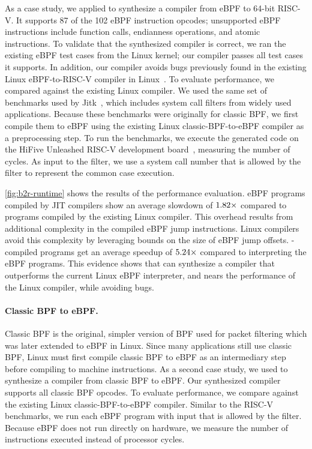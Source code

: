 As a case study, we applied \jitsynth to synthesize
a compiler from eBPF to 64-bit RISC-V.
%
It supports 87 of the 102 eBPF instruction opcodes;
unsupported eBPF instructions include function calls,
endianness operations, and atomic instructions.
%
To validate that the synthesized compiler is correct, we ran the existing
eBPF test cases from the Linux kernel; our compiler passes all test cases
it supports. %
%
In addition, our compiler avoids bugs previously found in the existing
Linux eBPF-to-RISC-V compiler in Linux~\cite{nelson:bpf-riscv-add32-bug}.
%
To evaluate performance, we compared against the existing Linux compiler.
%
We used the same set of benchmarks used by Jitk~\cite{wang:jitk},
which includes system call filters from widely used applications.
%
Because these benchmarks were originally for classic BPF,
we first compile them to eBPF using the existing
Linux classic-BPF-to-eBPF compiler as a preprocessing step.
%
To run the benchmarks, we execute the generated
code on the HiFive Unleashed RISC-V development board~\cite{sifive:fu540-c000}, measuring
the number of cycles.
%
As input to the filter, we use a system call number that is allowed
by the filter to represent the common case execution.


\autoref{fig:b2r-runtime} shows the results of the performance evaluation.
%
eBPF programs compiled by \jitsynth JIT compilers show an average slowdown of $1.82\times$
compared to programs compiled by the existing Linux compiler.
%
This overhead results from additional complexity in the compiled eBPF jump instructions.
%
Linux compilers avoid this complexity by leveraging
bounds on the size of eBPF jump offsets.
%
\jitsynth-compiled programs get an average speedup of $5.24\times$
compared to interpreting the eBPF programs.
%
This evidence shows that \jitsynth can synthesize a compiler that outperforms
the current Linux eBPF interpreter, and nears the performance of the Linux
compiler, while avoiding bugs.
%

\paragraph{Classic BPF to eBPF.}

Classic BPF is the original, simpler version of BPF used for packet filtering which
was later extended to eBPF in Linux.
%
Since many applications still use classic BPF, Linux must first compile classic BPF
to eBPF as an intermediary step before compiling to machine instructions.
%
As a second case study, we used \jitsynth to synthesize a compiler from classic BPF to eBPF.
%
Our synthesized compiler supports all classic BPF opcodes.
%
To evaluate performance, we compare against the existing
Linux classic-BPF-to-eBPF compiler.
%
Similar to the RISC-V benchmarks, we run each eBPF program
with input that is allowed by the filter.
%
Because eBPF does not run directly on hardware, we measure
the number of instructions executed instead of processor cycles.


